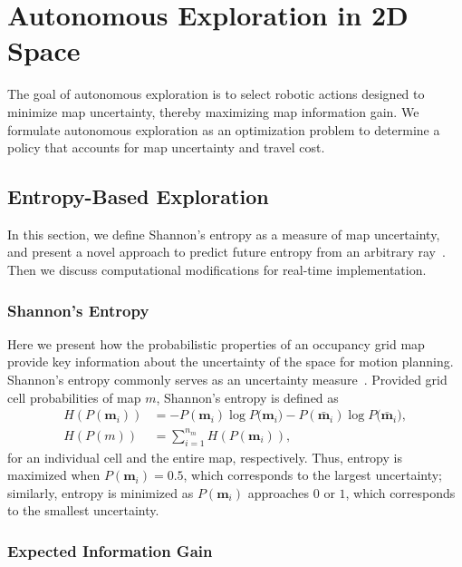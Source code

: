 
\chapter{Autonomous Exploration in 2D Space} \label{chap:ae2D}

The goal of autonomous exploration is to select robotic actions designed to minimize map uncertainty, thereby maximizing map information gain. We formulate autonomous exploration as an optimization problem to determine a policy that accounts for map uncertainty and travel cost.

\section{Entropy-Based Exploration}

In this section, we define Shannon's entropy as a measure of map uncertainty, and present a novel approach to predict future entropy from an arbitrary ray~\cite{KauAiLee16}. Then we discuss computational modifications for real-time implementation.

\subsection{Shannon's Entropy}

Here we present how the probabilistic properties of an occupancy grid map provide key information about the uncertainty of the space for motion planning. Shannon's entropy commonly serves as an uncertainty measure~\cite{StaGriBur05}. Provided grid cell probabilities of map $m$, Shannon's entropy is defined as
\begin{align}
\label{eqn:ShannonsEntropyCell}
H(P(\mathbf{m}_i))&=-P(\mathbf{m}_i)\log{P(\mathbf{m}_i})-P(\bar{\mathbf{m}}_i)\log{P(\bar{\mathbf{m}}_i}),
\\
\label{eqn:ShannonsEntropyMap}
H(P(m))&=\sum_{i=1}^{n_m}H(P(\mathbf{m}_i)),
\end{align}
for an individual cell and the entire map, respectively.
Thus, entropy is maximized when $P(\mathbf{m}_i)=0.5$, which corresponds to the largest uncertainty; similarly, entropy is minimized as $P(\mathbf{m}_i)$ approaches $0$ or $1$, which corresponds to the smallest uncertainty. %



\subsection{Expected Information Gain}

